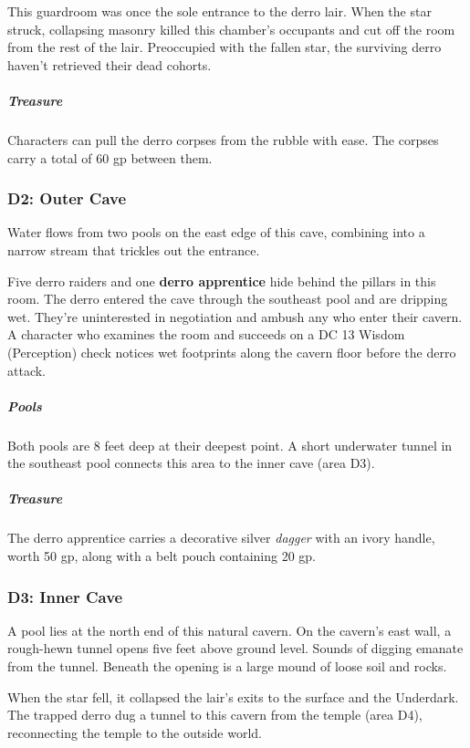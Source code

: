 \documentclass[10pt,a4paper,twoside,bg=print,twocolumn,openany,nodeprecatedcode]{dndbook}
\begin{document}
This guardroom was once the sole entrance to the derro lair. When the star struck, collapsing masonry killed this chamber's occupants and cut off the room from the rest of the lair. Preoccupied with the fallen star, the surviving derro haven't retrieved their dead cohorts.

\subparagraph{Treasure}
Characters can pull the derro corpses from the rubble with ease. The corpses carry a total of 60 gp between them.

\subsubsection{D2: Outer Cave}
\begin{DndReadAloud}{}
Water flows from two pools on the east edge of this cave, combining into a narrow stream that trickles out the entrance.

\end{DndReadAloud}

Five derro raiders and one \textbf{derro apprentice} hide behind the pillars in this room. The derro entered the cave through the southeast pool and are dripping wet. They're uninterested in negotiation and ambush any who enter their cavern. A character who examines the room and succeeds on a DC 13 Wisdom (Perception) check notices wet footprints along the cavern floor before the derro attack.

\subparagraph{Pools}
Both pools are 8 feet deep at their deepest point. A short underwater tunnel in the southeast pool connects this area to the inner cave (area D3).

\subparagraph{Treasure}
The derro apprentice carries a decorative silver \textit{dagger} with an ivory handle, worth 50 gp, along with a belt pouch containing 20 gp.

\subsubsection{D3: Inner Cave}
\begin{DndReadAloud}{}
A pool lies at the north end of this natural cavern. On the cavern's east wall, a rough-hewn tunnel opens five feet above ground level. Sounds of digging emanate from the tunnel. Beneath the opening is a large mound of loose soil and rocks.

\end{DndReadAloud}

When the star fell, it collapsed the lair's exits to the surface and the Underdark. The trapped derro dug a tunnel to this cavern from the temple (area D4), reconnecting the temple to the outside world.
\end{document}
